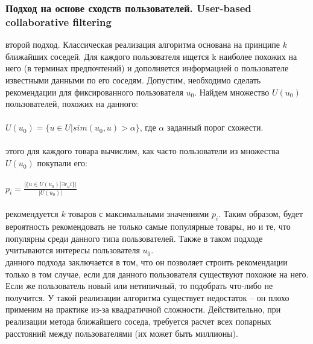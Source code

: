 \documentclass{article}
\newcommand\tab[1][1cm]{\hspace*{#1}}
\begin{document}
\subsubsection{Подход на основе сходств пользователей. User-based collaborative filtering}
 второй подход. Классическая реализация алгоритма основана на принципе $k$ ближайших соседей. Для каждого пользователя ищется k наиболее похожих на него (в терминах предпочтений) и дополняется информацией о пользователе известными данными по его соседям. Допустим, необходимо сделать рекомендации для фиксированного пользователя $u_0$. Найдем множество ﻿$U(u_0)$ пользователей, похожих на данного:\\
\\
\tab$U(u_0)=\{u\in U|sim(u_0,u)>\alpha\}$, где ﻿$\alpha$ заданный порог схожести.\\
\\
 этого для каждого товара вычислим, как часто пользователи из множества $U(u_0)$ покупали его:\\
\\
\tab$p_i=\frac{|\{u\in U(u_0)|\exists r_ui\}|}{|U(u_0)|}$\\
\\
 рекомендуется ﻿$k$ товаров с максимальными значениями ﻿$p_i$. Таким образом, будет вероятность рекомендовать не только самые популярные товары, но и те, что популярны среди данного типа пользователей. Также в таком подходе учитываются интересы пользователя $u_0$﻿.\\
 данного подхода заключается в том, что он позволяет строить рекомендации только в том случае, если для данного пользователя существуют похожие на него. Если же пользователь новый или нетипичный, то подобрать что-либо не получится. У такой реализации алгоритма существует недостаток – он плохо применим на практике из-за квадратичной сложности. Действительно, при реализации метода ближайшего соседа, требуется расчет всех попарных расстояний между пользователями (их может быть миллионы).
\end{document}
